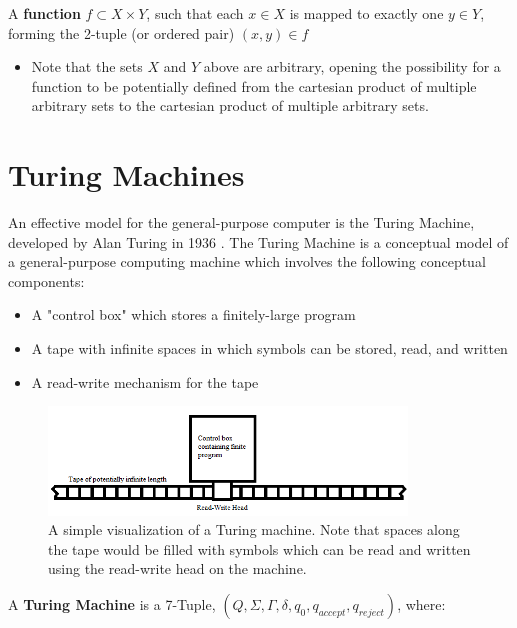 \documentclass{article}
\begin{document}
\begin{defin}
A \textbf{function} $f \subset X \times Y$, such that each $x \in X$ is mapped to exactly one $y \in Y$, forming the 2-tuple (or ordered pair) $(x, y) \in f$
\end{defin}
\begin{itemize}
\item Note that the sets $X$ and $Y$ above are arbitrary, opening the possibility for a function to be potentially defined from the cartesian product of multiple arbitrary sets to the cartesian product of multiple arbitrary sets.
\end{itemize}

\section{Turing Machines}
An effective model for the general-purpose computer is the Turing Machine, developed by Alan Turing in 1936 \cite{2}.  The Turing Machine is a conceptual model of a general-purpose computing machine which involves the following conceptual components:
\begin{itemize}
	\item A "control box" which stores a finitely-large program
	\item A tape with infinite spaces in which symbols can be stored, read, and written
	\item A read-write mechanism for the tape \cite{3}
\end{itemize}
\begin{figure}[h]
	\includegraphics[width=0.85\textwidth]{figure-3-1}
	\centering
	\setlength{\belowcaptionskip}{-10pt}
	\caption{A simple visualization of a Turing machine.  Note that spaces along the tape would be filled with symbols which can be read and written using the read-write head on the machine.}
\end{figure}
\begin{defin}
	A \textbf{Turing Machine} is a 7-Tuple, $(Q, \Sigma, \Gamma, \delta, q_{0}, q_{accept}, q_{reject})$, where:
\end{defin}
\end{document}
